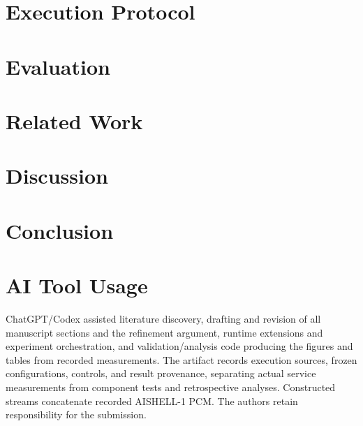\documentclass[conference,10pt]{IEEEtran}
\begin{document}
\section{Execution Protocol}\label{sec:protocol}


\section{Evaluation}\label{sec:eval}




\section{Related Work}\label{sec:related}

\section{Discussion}\label{sec:discussion}

\section{Conclusion}\label{sec:conclusion}

\section*{AI Tool Usage}
ChatGPT/Codex assisted literature discovery, drafting and revision of all
manuscript sections and the refinement argument, runtime extensions and
experiment orchestration, and validation/analysis code producing the
figures and tables from recorded measurements. The artifact records
execution sources, frozen configurations, controls, and result provenance,
separating actual service measurements from component tests and
retrospective analyses. Constructed streams concatenate recorded AISHELL-1
PCM. The authors retain responsibility for the submission.
\clearpage


\end{document}
